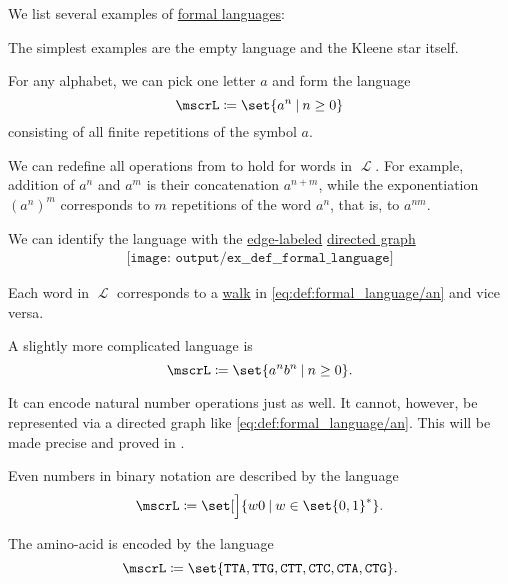 \begin{example}\label{ex:def:formal_language}
  We list several examples of \hyperref[def:formal_language]{formal languages}:
  \begin{thmenum}
     The simplest examples are the empty language and the Kleene star itself.

     For any alphabet, we can pick one letter \( a \) and form the language
    \begin{equation*}
      \mscrL \coloneqq \set{ a^n \given n \geq 0 }
    \end{equation*}
    consisting of all finite repetitions of the symbol \( a \).

    We can redefine all operations from  to hold for words in \( \mscrL \). For example, addition of \( a^n \) and \( a^m \) is their concatenation \( a^{n + m} \), while the exponentiation \( (a^n)^m \) corresponds to \( m \) repetitions of the word \( a^n \), that is, to \( a^{nm} \).

    We can identify the language with the \hyperref[def:labeled_set]{edge-labeled} \hyperref[def:directed_graph]{directed graph}
    \begin{equation}\label{eq:def:formal_language/an}
      \begin{aligned}
        \texttt{[image: output/ex\_\_def\_\_formal\_language]}
      \end{aligned}
    \end{equation}

    Each word in \( \mscrL \) corresponds to a \hyperref[def:graph_walk/directed]{walk} in \eqref{eq:def:formal_language/an} and vice versa.

     A slightly more complicated language is
    \begin{equation*}
      \mscrL \coloneqq \set{ a^n b^n \given n \geq 0 }.
    \end{equation*}

    It can encode natural number operations just as well. It cannot, however, be represented via a directed graph like \eqref{eq:def:formal_language/an}. This will be made precise and proved in .

     Even numbers in binary notation are described by the language
    \begin{equation*}
      \mscrL \coloneqq \set[\Big]{ w0 \given w \in \set{ 0, 1 }^* }.
    \end{equation*}

     The  amino-acid is encoded by the language
    \begin{equation*}
       \mscrL \coloneqq \set{ \texttt{TTA}, \texttt{TTG}, \texttt{CTT}, \texttt{CTC}, \texttt{CTA}, \texttt{CTG} }.
    \end{equation*}
  \end{thmenum}
\end{example}

